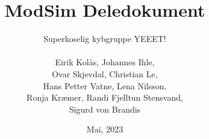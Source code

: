 \documentclass[11pt, a4paper, USenglish]{article} %
\begin{document}
\title{ModSim Deledokument}
\author{Superkoselig kybgruppe YEEET!\\\\
Eirik Kolås, Johannes Ihle, \\Ovar Skjevdal, Christian Le, \\
Hans Petter Vatne, Lena Nilsson, \\
Ronja Kræmer, Randi Fjelltun Stensvand, \\
Sigurd von Brandis}

\date{Mai, 2023}
\begin{titlepage}
    \maketitle
    \thispagestyle{empty}
\end{titlepage}

\newpage
\tableofcontents
\thispagestyle{empty} %


\newpage
\setcounter{page}{1}











\newpage

\end{document}
